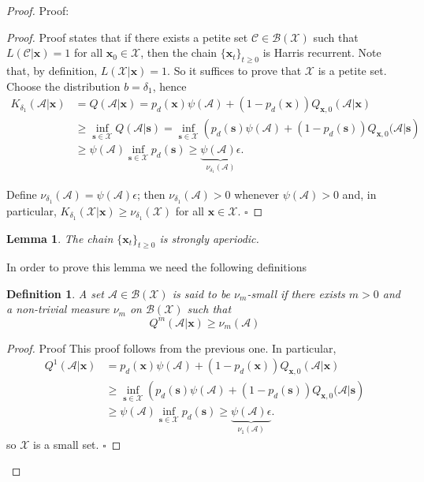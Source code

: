 \documentclass[12pt,a4paper]{article}
\newtheorem{lemma}{Lemma}
\newtheorem{definition}{Definition}
\newcommand{\bx}{\mathbf{x}}
\newcommand{\bs}{\mathbf{s}}
\begin{document}
\begin{proof}{Proof:}
		\begin{proof}{Proof}
			\cite[Proposition 9.1.7]{stochastic-stability} states that if there exists a petite set $\mathcal{C} \in \mathcal{B}(\mathcal{X})$ such that $L(\mathcal{C}|\bx)=1$ for all $\bx_0 \in \mathcal{X}$, then the chain $\{\bx_t\}_{t\geq0}$ is Harris recurrent. Note that, by definition, $L(\mathcal{X}|\bx)=1$. So it suffices to prove that $\mathcal{X}$ is a petite set. Choose the distribution $b=\delta_1$, hence
			\begin{align*}
				K_{\delta_1}(\mathcal{A}|\bx) &= Q(\mathcal{A}|\bx) = p_d(\bx) \psi(\mathcal{A}) + (1-p_d(\bx)) Q_{\bx,0}(\mathcal{A}|\bx)\\
				&\geq \inf_{\bs \in \mathcal{X}} Q(\mathcal{A}|\bs) = \inf_{\bs \in \mathcal{X}} \left(p_d(\bs) \psi(\mathcal{A}) + (1-p_d(\bs)) Q_{\bx,0}(\mathcal{A}|\bs \right)\\
				&\geq \psi(\mathcal{A})\inf_{\bs \in \mathcal{X}}  p_d(\bs) \geq  \underbrace{\psi(\mathcal{A})\epsilon}_{\nu_{\delta_1}(\mathcal{A})}.
			\end{align*}
			
			Define $\nu_{\delta_1}(\mathcal{A})=\psi(\mathcal{A})\epsilon$; then $\nu_{\delta_1}(\mathcal{A})>0 $ whenever $\psi(\mathcal{A})>0$ and, in particular, $ K_{\delta_1}(\mathcal{X}|\bx)\geq {\nu_{\delta_1}(\mathcal{X})}$ for all $\bx \in \mathcal{X}$.  \hfill $\square$
		\end{proof}
		
		\begin{lemma}\label{lemma_aperiodic}
			The chain $\{\bx_t\}_{t\geq0}$ is strongly aperiodic.
		\end{lemma}
		
		In order to prove this lemma we need the following definitions
		
		\begin{definition}
			A set $\mathcal{A} \in \mathcal{B}(\mathcal{X})$ is said to be $\nu_m$-small if there exists $m>0$ and a non-trivial measure $\nu_m$ on $\mathcal{B}(\mathcal{X})$ such that 
			\begin{equation}\label{small_set}
				Q^m(\mathcal{A}|\bx) \geq \nu_m(\mathcal{A})
			\end{equation}
		\end{definition}
		
		
		\begin{proof}{Proof}
			This proof follows from the previous one. In particular,
			\begin{align*}
				Q^1(\mathcal{A}|\bx) &=  p_d(\bx) \psi(\mathcal{A}) + (1-p_d(\bx)) Q_{\bx,0}(\mathcal{A}|\bx)\\
				&\geq \inf_{\bs \in \mathcal{X}} \left(p_d(\bs) \psi(\mathcal{A}) + (1-p_d(\bs)) Q_{\bx,0}(\mathcal{A}|\bs \right)\\
				&\geq \psi(\mathcal{A})\inf_{\bs \in \mathcal{X}}  p_d(\bs) \geq  \underbrace{\psi(\mathcal{A})\epsilon}_{\nu_{1}(\mathcal{A})}.
			\end{align*}
			so $\mathcal{X}$ is a small set. \hfill $\square$
		\end{proof}
		
	   \end{proof}	
		
\end{document}

